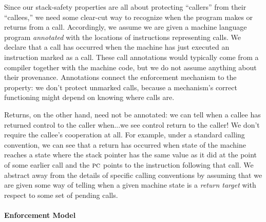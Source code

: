 \documentclass[acmsmall,review,anonymous]{acmart}\settopmatter{printfolios=true,printccs=false,printacmref=false}
\begin{document}
Since our stack-safety properties are all about protecting ``callers'' from
their ``callees,'' we need some clear-cut way to recognize when the program
makes or returns from a call.  Accordingly, we assume we are given a machine
language program {\em annotated} with the locations of instructions
representing calls.  We declare that a call has occurred when the machine
has just executed an instruction marked as a call.
%
These call annotations would typically come from a compiler together with
the machine code, but we do not assume anything about their provenance.
Annotations connect the enforcement mechanism to the property: we don't
protect unmarked calls, because a mechanism's correct functioning might
depend on knowing where calls are.

Returns, on the other hand, need not be annotated: we can tell when a callee
has returned control to the caller when...we see control return to the
caller! We don't require the callee's cooperation at all.
For example, under a standard calling convention, we can see that a
return has occurred when state of the machine reaches a state where
the stack pointer has the same value as it did at the point of some earlier
call and the $\textsc{pc}$ points to the instruction following that call.  We
abstract away from the details of specific calling conventions by assuming
that we are given some way of telling when a given machine state is a
{\em return target} with respect to some set of pending calls.


\paragraph*{Enforcement Model}
\end{document}
